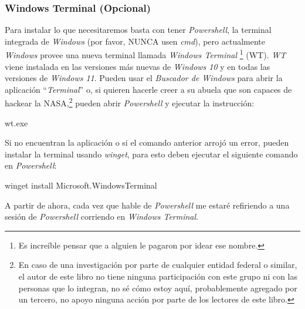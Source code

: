 \subsubsection{Windows Terminal (Opcional)}
  Para instalar lo que necesitaremos basta con tener \textit{Powershell}, la terminal integrada de
  \textit{Windows} (por favor, NUNCA usen \textit{cmd}), pero actualmente \textit{Windows} provee
  una nueva terminal llamada \textit{Windows Terminal}
  \autocite{cinnamon-msftOverviewWindowsTerminal}\footnote{Es increíble pensar que a alguien
  le pagaron por idear ese nombre.} (WT).
  \textit{WT} viene instalada en las 
  versiones más nuevas de \textit{Windows 10} y en todas las versiones de \textit{Windows 11}.
  Pueden usar el \textit{Buscador de Windows} para abrir la aplicación \enquote{\textit{Terminal}}
  o, si quieren hacerle creer a su abuela que son capaces de hackear la NASA,\footnote{En caso de 
  una investigación por parte de cualquier entidad federal o similar, el autor de este libro no 
  tiene ninguna participación con este grupo ni con las personas que lo integran, no sé cómo 
  estoy aquí, probablemente agregado por un tercero, no apoyo ninguna acción por parte de los 
  lectores de este libro.} pueden abrir \textit{Powershell} y ejecutar la instrucción:
  \begin{powershell}
    wt.exe
  \end{powershell}

  Si no encuentran la aplicación o si el comando anterior arrojó un error, pueden instalar la 
  terminal usando \textit{winget}, para esto deben ejecutar el siguiente comando en 
  \textit{Powershell}:
  \begin{powershell}
    winget install Microsoft.WindowsTerminal
  \end{powershell}

  A partir de ahora, cada vez que hable de \textit{Powershell} me estaré refiriendo a una sesión
  de \textit{Powershell} corriendo en \textit{Windows Terminal}.

